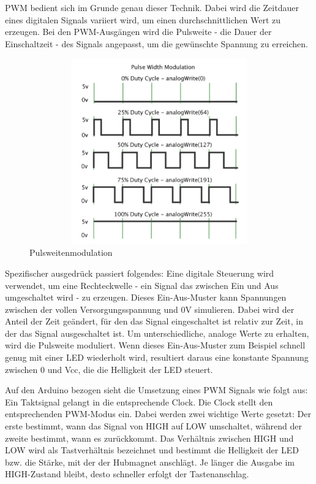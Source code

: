 \ac{PWM} bedient sich im Grunde genau dieser Technik.
Dabei wird die Zeitdauer eines digitalen Signals variiert wird, um einen durchschnittlichen Wert zu erzeugen.
Bei den \ac{PWM}-Ausgängen wird die Pulsweite - die Dauer der Einschaltzeit - des Signals angepasst, um die gewünschte Spannung zu erreichen.

\begin{figure}[htbp]
	\centering
	\includegraphics [width=13cm, height=8cm] {img/pulsweite}
	\caption{Pulsweitenmodulation}
	\label{fig:pulsweite}
\end{figure}

Spezifischer ausgedrück passiert folgendes:
Eine digitale Steuerung wird verwendet, um eine Rechteckwelle - ein Signal das zwischen Ein und Aus umgeschaltet wird - zu erzeugen.
Dieses Ein-Aus-Muster kann Spannungen zwischen der vollen Versorgungsspannung und 0V simulieren.
Dabei wird der Anteil der Zeit geändert, für den das Signal eingeschaltet ist relativ zur Zeit, in der das Signal ausgeschaltet ist.
Um unterschiedliche, analoge Werte zu erhalten, wird die Pulsweite moduliert.
Wenn dieses Ein-Aus-Muster zum Beispiel schnell genug mit einer LED wiederholt wird, resultiert daraus eine konstante Spannung zwischen 0 und Vcc, die die Helligkeit der LED steuert.

Auf den Arduino bezogen sieht die Umsetzung eines \ac{PWM} Signals wie folgt aus:
Ein Taktsignal gelangt in die entsprechende Clock.
Die Clock stellt den entsprechenden \ac{PWM}-Modus ein.
Dabei werden zwei wichtige Werte gesetzt:
Der erste bestimmt, wann das Signal von HIGH auf LOW umschaltet, während der zweite bestimmt, wann es zurückkommt.
Das Verhältnis zwischen HIGH und LOW wird als Tastverhältnis bezeichnet und bestimmt die Helligkeit der LED bzw. die Stärke, mit der der Hubmagnet anschlägt.
Je länger die Ausgabe im HIGH-Zustand bleibt, desto schneller erfolgt der Tastenanschlag.


